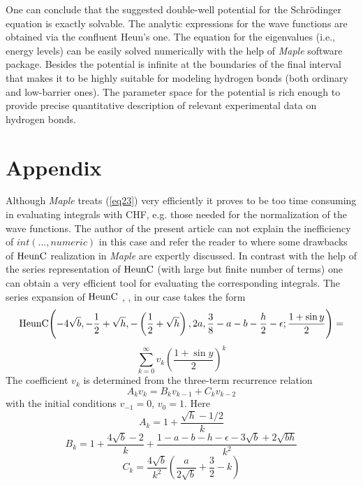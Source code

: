 \documentclass[singlespacing]{elsart}
\begin{document}
One can conclude that the suggested double-well potential for the Schr\"odinger equation is exactly solvable. The analytic expressions for the wave functions are obtained via the confluent Heun's one. The equation for the eigenvalues (i.e., energy levels) can be easily solved numerically with the help of {\sl {Maple}} software package. Besides the potential is infinite at the boundaries of the final interval that makes it to be highly suitable for modeling hydrogen bonds (both ordinary and low-barrier ones). The parameter space for the potential is rich enough to provide precise quantitative description of relevant experimental data on hydrogen bonds.

\section{Appendix}
Although {\sl {Maple}} treats (\ref{eq23}) very efficiently it proves to be too time consuming in evaluating integrals with CHF, e.g. those needed for the normalization of the wave functions. The author of the present article can not explain the inefficiency of $int(...,numeric)$ in this case and refer the reader to \cite{Fiz12} where some drawbacks of ${\rm HeunC}$ realization in {\sl {Maple}} are expertly discussed.
In contrast with the help of the series representation of ${\rm HeunC}$ (with large but finite number of terms)
one can obtain a very efficient tool for evaluating the corresponding integrals.
The series expansion of ${\rm HeunC}$ \cite{Ron95}, \cite{Sla00}, \cite{Fiz10} in our case takes the form
\[
{\rm HeunC} \Biggl(-4\sqrt {b},-\frac{1}{2}+\sqrt {h},-\left(\frac{1}{2}+\sqrt {h}\right),2a,
\frac{3}{8}-a-b-\frac{h}{2}-\epsilon;\frac{1+\sin y}{2}\Biggr)=
\]
\begin{equation}
\label{eq26}
\sum_{k=0}^{\infty}v_k \left(\frac{1+\sin y}{2}\right)^k
\end{equation}
The coefficient $v_k$ is determined from the three-term recurrence relation
\begin{equation}
\label{eq27} A_k v_k=B_k v_{k-1}+C_k v_{k-2}
\end{equation}
with the initial conditions $v_{-1}=0$, $v_0=1$. Here
\begin{equation}
\label{eq28} A_k=1+\frac{\sqrt{h}-1/2}{k}
\end{equation}
\begin{equation}
\label{eq29} B_k=1+\frac{4\sqrt {b}-2}{k}+\frac{1-a-b-h-\epsilon-3\sqrt{b}+2\sqrt{bh}}{k^2}
\end{equation}
\begin{equation}
\label{eq30} C_k=\frac{4\sqrt{b}}{k^2}\left(\frac{a}{2\sqrt{b}}+\frac{3}{2}-k\right)
\end{equation}
\end{document}
